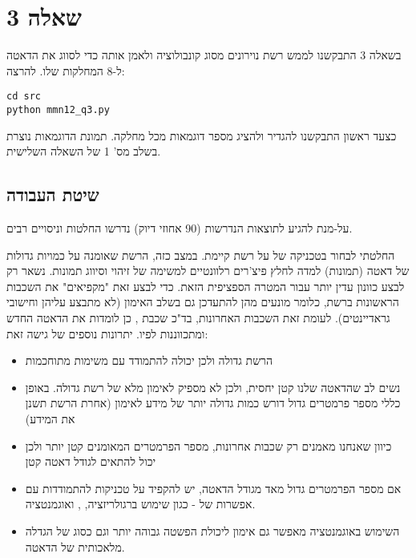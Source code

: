 \HE
\section*{שאלה {3}}
בשאלה 3 התבקשנו לממש רשת נוירונים מסוג קונבולוציה ולאמן אותה כדי לסווג את הדאטה ל-8 המחלקות שלו.\newline
להרצה:
\EN
\begin{framed}
\begin{verbatim}
cd src
python mmn12_q3.py
\end{verbatim}
\end{framed}
\HE

כצעד ראשון התבקשנו להגדיר  ולהציג מספר דוגמאות מכל מחלקה.
תמונת הדוגמאות נוצרת בשלב מס' 1 של השאלה השלישית. 
\newline

\subsection*{שיטת העבודה}
על-מנת להגיע לתוצאות הנדרשות (90 אחוזי דיוק) נדרשו החלטות וניסויים רבים.

החלטתי לבחור בטכניקה של  על רשת קיימת.
במצב כזה, הרשת שאומנה על כמויות גדולות של דאטה (תמונות) למדה לחלץ פיצ'רים רלוונטיים למשימה של זיהוי וסיווג תמונות. נשאר רק לבצע כוונון עדין יותר עבור המטרה הספציפית הזאת.\newline
כדי לבצע זאת "מקפיאים" את השכבות הראשונות ברשת, כלומר מונעים מהן להתעדכן גם בשלב האימון (לא מתבצע עליהן  וחישובי גראדיינטים). לעומת זאת השכבות האחרונות, בד"כ שכבת , כן לומדות את הדאטה החדש ומתכווננות לפיו. \newline
יתרונות נוספים של גישה זאת:
\begin{itemize}
    \item הרשת גדולה ולכן יכולה להתמודד עם משימות מתוחכמות
    \item נשים לב שהדאטה שלנו קטן יחסית, ולכן לא מספיק לאימון מלא של רשת גדולה. באופן כללי מספר פרמטרים גדול דורש כמות גדולה יותר של מידע לאימון (אחרת הרשת תשנן את המידע)
    \item כיוון שאנחנו מאמנים רק שכבות אחרונות, מספר הפרמטרים המאומנים קטן יותר ולכן יכול להתאים לגודל דאטה קטן
    \item אם מספר הפרמטרים גדול מאד מגודל הדאטה, יש להקפיד על טכניקות להתמודדות עם אפשרות של  - כגון שימוש ברגולריזציה, , ואוגמנטציה.
    \item השימוש באוגמנטציה מאפשר גם אימון ליכולת הפשטה גבוהה יותר וגם כסוג של הגדלה מלאכותית של הדאטה.
\end{itemize}

